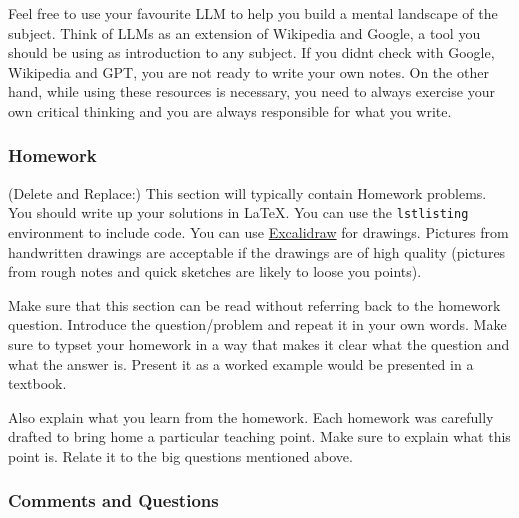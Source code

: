 \documentclass{article}
\theoremstyle{theorem}
\theoremstyle{definition}
\theoremstyle{remark}
\begin{document}
Feel free to use your favourite LLM to help you build a mental landscape of the subject. Think of LLMs as an extension of Wikipedia and Google, a tool you should be using as introduction to any subject. If you didnt check with Google, Wikipedia and GPT, you are not ready to write your own notes. On the other hand, while using these resources is necessary, you need to always exercise your own critical thinking and you are always responsible for what you write. 

\subsubsection*{Homework}

(Delete and Replace:) This section will typically contain Homework problems. You should write up your solutions in \LaTeX. You can use the \texttt{lstlisting} environment to include code. You can use \href{https://excalidraw.com/}{Excalidraw} for drawings. Pictures from handwritten drawings are acceptable if the drawings are of high quality (pictures from rough notes and quick sketches are likely to loose you points). 

Make sure that this section can be read without referring back to the homework question. Introduce the question/problem and repeat it in your own words. Make sure to typset your homework in a way that makes it clear what  the question and what the answer is. Present it as a worked example would be presented in a textbook. 

Also explain what you learn from the homework. Each homework was carefully drafted to bring home a particular teaching point. Make sure to explain what this point is. Relate it to the big questions mentioned above. 

%
%

\subsubsection*{Comments and Questions}
\end{document}
